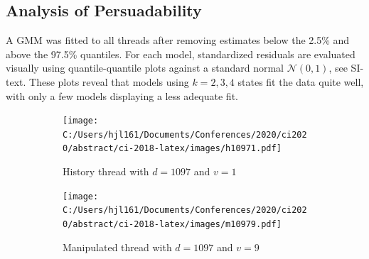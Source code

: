 \documentclass[9pt,twocolumn,twoside,lineno]{pnas-new}
\begin{document}
\subsection*{Analysis of Persuadability} 
A GMM was fitted to all threads after removing estimates below the 2.5\% and above the 97.5\% quantiles. For each model, standardized residuals are evaluated visually using quantile-quantile plots against a standard normal $\mathcal{N}(0,1)$, see SI-text. These plots reveal that models using $k=2,3,4$ states fit the data quite well, with only a few models displaying a less adequate fit.

\begin{figure}[!h]
	\centering
	\begin{subfigure}{.44\linewidth}
		\centering
		\texttt{[image: C:/Users/hjl161/Documents/Conferences/2020/ci2020/abstract/ci-2018-latex/images/h10971.pdf]}
		\caption{\footnotesize History thread with $d=1097$ and $v=1$}
		\label{fig: h=history d=1097, v=1}
	\end{subfigure}
	\begin{subfigure}{.44\linewidth}
		\centering
		\texttt{[image: C:/Users/hjl161/Documents/Conferences/2020/ci2020/abstract/ci-2018-latex/images/m10979.pdf]}
		\caption{\footnotesize Manipulated thread with $d=1097$ and $v=9$}
		\label{fig: h=max d=1097, v=9}
	\end{subfigure}
	\begin{subfigure}{.1\linewidth}
		\centering

\end{subfigure}
\end{figure}
\end{document}
